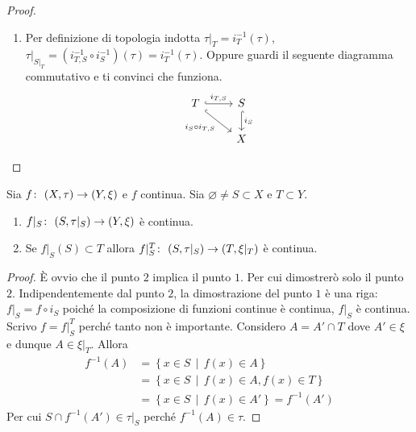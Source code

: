 \begin{proof}
\begin{enumerate}
\begin{proof}
	\end{proof} 
	\begin{proof}
		Dimostro prima che $\bar{W}^{\tau|_S} \subset \bar{W}^\tau \cap S$. $W \subset \bar{W}^\tau \cap S$ poiché $W \subset S$. Inoltre $\bar{W}^\tau \cap S$ è un chiuso in $\tau|_S$, quindi per la definizione di chiusura (e la sua minimalità), dev'essere che $\bar{W}^{\tau|_S} \subset \bar{W}^\tau \cap S$.
		Dimostro $ \bar{W}^\tau \cap S\subset \bar{W}^{\tau|_S}$. Per il punto $2$ esiste un chiuso $C$ di $\tau$ tale che $C \cap S = \bar{W}^{\tau|_S}$. Per cui $W \subset C$ e per l'ipotesi di minimalità della chiusura ho anche che $\bar{W}^\tau \subset C$, e segue $\bar{W}^\tau \cap S \subset C \cap S = \bar{W}^{\tau|_S}$.
	\end{proof}
	\item 
		Per definizione di topologia indotta $\tau|_T = i^{-1}_T(\tau)$, $\tau|_{S|_T} = (i^{-1}_{T,S} \circ i^{-1}_{S}) (\tau) = i^{-1}_T(\tau)$. Oppure guardi il seguente diagramma commutativo e ti convinci che funziona.
		\begin{equation*}
		\begin{tikzcd}
				T \arrow[hook]{r}{i_{T,S}} \arrow[hook,swap]{rd}{i_{S} \circ i_{T,S}} & S \arrow[hook]{d}{i_S} \\
																							 & X
		\end{tikzcd}
		\end{equation*}	
\end{enumerate}
\end{proof}


\begin{theorem}
	Sia $f \colon\ (X,\tau) \rightarrow (Y,\xi)$ e $f$ continua. Sia $\varnothing \neq S \subset X$ e $T \subset Y$.
	\begin{enumerate}
		\item $f|_S \colon\ (S, \tau|_S) \rightarrow (Y, \xi)$ è continua.
		\item Se $f|_S(S) \subset T$ allora $f|^T_S \colon\ (S, \tau|_S) \rightarrow (T, \xi|_T)$ è continua.
	\end{enumerate}
\end{theorem}
\begin{proof}
	È ovvio che il punto $2$ implica il punto $1$. Per cui dimostrerò solo il punto $2$. Indipendentemente dal punto $2$, la dimostrazione del punto $1$ è una riga: $f|_S = f \circ i_S$ poiché la composizione di funzioni continue è continua, $f|_S$ è continua.\\
	
	Scrivo $f = f|^T_S$ perché tanto non è importante. Considero $A = A' \cap T$ dove $A' \in \xi$ e dunque $A \in \xi|_T$. Allora 
	\begin{align*}
		f^{-1}(A) & = \left\{x \in  S \,\middle|\, f(x) \in A \right\} \\
					  & = \left\{x \in  S \,\middle|\, f(x) \in A , f(x) \in T \right\} \\
					  & =  \left\{x \in  S \,\middle|\, f(x) \in A'\right\} = f^{-1}(A')
	\end{align*}
	Per cui $S \cap f^{-1}(A') \in \tau|_S$ perché $f^{-1}(A) \in \tau$.
\end{proof}


